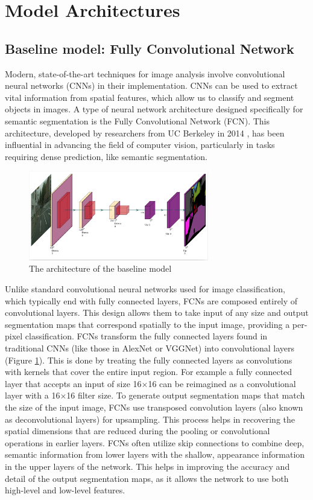 \section{Model Architectures}
\subsection{Baseline model: Fully Convolutional Network}

Modern, state-of-the-art techniques for image analysis involve convolutional neural networks (CNNs) in their implementation. CNNs can be used to extract vital information from spatial features, which allow us to classify and segment objects in images. A type of neural network architecture designed specifically for semantic segmentation is the Fully Convolutional Network (FCN). This architecture, developed by researchers from UC Berkeley in 2014 \cite{DBLP:journals/corr/LongSD14}, has been influential in advancing the field of computer vision, particularly in tasks requiring dense prediction, like semantic segmentation. 

\begin{figure}
    \centering 
    \includegraphics[width=0.7\textwidth]{SimpleFCN.png}
    \caption{The architecture of the baseline model}
    \label{fig:fcn-arch}
\end{figure}

Unlike standard convolutional neural networks used for image classification, which typically end with fully connected layers, FCNs are composed entirely of convolutional layers. This design allows them to take input of any size and output segmentation maps that correspond spatially to the input image, providing a per-pixel classification. FCNs transform the fully connected layers found in traditional CNNs (like those in AlexNet or VGGNet) into convolutional layers (Figure \ref{fig:fcn-arch}). This is done by treating the fully connected layers as convolutions with kernels that cover the entire input region. For example a fully connected layer that accepts an input of size 16$\times$16 can be reimagined as a convolutional layer with a 16$\times$16 filter size. To generate output segmentation maps that match the size of the input image, FCNs use transposed convolution layers (also known as deconvolutional layers) for upsampling. This process helps in recovering the spatial dimensions that are reduced during the pooling or convolutional operations in earlier layers. FCNs often utilize skip connections to combine deep, semantic information from lower layers with the shallow, appearance information in the upper layers of the network. This helps in improving the accuracy and detail of the output segmentation maps, as it allows the network to use both high-level and low-level features. 

